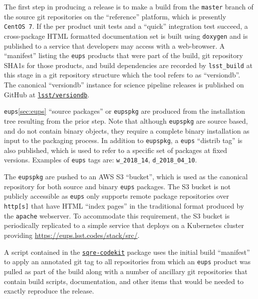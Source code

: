 The first step in producing a release is to make a build from the
\texttt{master} branch of the source git repositories on the ``reference''
platform, which is presently \texttt{CentOS~7}.  If the per product unit tests
and a ``quick'' integration test succeed, a cross-package HTML
formatted documentation set is built using \texttt{doxygen}\cite{doxygen} and is published to
a service that developers may access with a web-browser.
A ``manifest'' listing the \texttt{eups} products that were part of the build,
git repository SHA1s for those products, and build dependencies are recorded by
\texttt{lsst\_build} at this stage in a git repository structure which the tool
refers to as ``versiondb''.  The canonical ``versiondb'' instance for science
pipeline releases is published on GitHub at
\href{https://github.com/lsst/versiondb}{\texttt{lsst/versiondb}}.

\label{sec:scipipe-deploy-src}
\texttt{eups}\ref{sec:eups} ``source packages'' or \texttt{eupspkg} are
produced from the installation tree resulting from the prior step.  Note that
although \texttt{eupspkg} are source based, and do not contain binary objects,
they require a complete binary installation as input to the packaging process.
In addition to \texttt{eupspkg}, a \texttt{eups} ``distrib tag'' is also
published, which is used to refer to a specific set of packages at fixed
versions.  Examples of \texttt{eups} tags are: \texttt{w\_2018\_14}, \texttt{d\_2018\_04\_10}.

\noindent The \texttt{eupspkg} are pushed to an AWS S3 ``bucket'', which is used as the
canonical repository for both source and binary \texttt{eups} packages.  The S3
bucket is not publicly accessible as \texttt{eups} only supports remote
package repositories over \texttt{http[s]} that have HTML ``index
pages'' in the traditional format produced by the \texttt{apache}
webserver.  To accommodate this
requirement, the S3 bucket is periodically replicated to a simple
service that deploys on a Kubernetes cluster providing \url{https://eups.lsst.codes/stack/src/}.

A script contained in the
\href{https://github.com/lsst-sqre/sqre-codekit}{\texttt{sqre-codekit}} package
uses the initial build ``manifest'' to apply an annotated git tag to all
repositories from which an \texttt{eups} product was pulled as part of the
build along with a number of ancillary git repositories that contain build
scripts, documentation, and other items that would be needed to exactly reproduce the
release.

